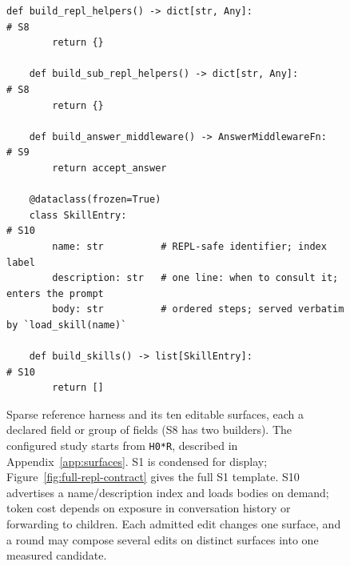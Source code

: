 \begin{figure}[!tbp]
\begin{lstlisting}[style=harness]
    def build_repl_helpers() -> dict[str, Any]:                          # S8
        return {}
    
    def build_sub_repl_helpers() -> dict[str, Any]:                      # S8
        return {}
    
    def build_answer_middleware() -> AnswerMiddlewareFn:                 # S9
        return accept_answer
    
    @dataclass(frozen=True)
    class SkillEntry:                                                    # S10
        name: str          # REPL-safe identifier; index label
        description: str   # one line: when to consult it; enters the prompt
        body: str          # ordered steps; served verbatim by `load_skill(name)`
    
    def build_skills() -> list[SkillEntry]:                              # S10
        return []
    \end{lstlisting}
    \caption{Sparse reference harness \hzero{} and its ten editable surfaces,
    each a declared field or group of fields (S8 has two builders). The configured
    study starts from \texttt{H0*R}, described in Appendix~\ref{app:surfaces}.
    S1 is condensed for display; Figure~\ref{fig:full-repl-contract} gives the
    full \hzero{} S1 template. S10 advertises a name/description index and loads
    bodies on demand; token cost depends on exposure in conversation history or
    forwarding to children. Each admitted edit changes one surface, and a round
    may compose several edits on distinct surfaces into one measured candidate.}
    \label{fig:edit-surfaces}
\end{figure}
    
